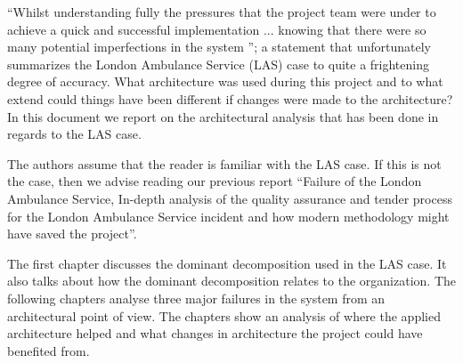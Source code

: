 ``Whilst understanding fully the pressures that the project team were under to achieve a quick and successful implementation ...
knowing that there were so many potential imperfections in the system \autocite[4002]{officialreport}'';
a statement that unfortunately summarizes the London Ambulance Service (LAS) case to quite a frightening degree of accuracy.
What architecture was used during this project and to what extend could things have been different if changes were made to the architecture?
In this document we report on the architectural analysis that has been done in regards to the LAS case.

The authors assume that the reader is familiar with the LAS case.
If this is not the case, then we advise reading our previous report
``Failure of the London Ambulance Service, In-depth analysis of the quality assurance and tender process for the London Ambulance Service incident and how modern methodology might have saved the project''.

The first chapter discusses the dominant decomposition used in the LAS case.
It also talks about how the dominant decomposition relates to the organization.
The following chapters analyse three major failures in the system from an architectural point of view.
The chapters show an analysis of where the applied architecture helped and what changes in architecture the project could have benefited from.
